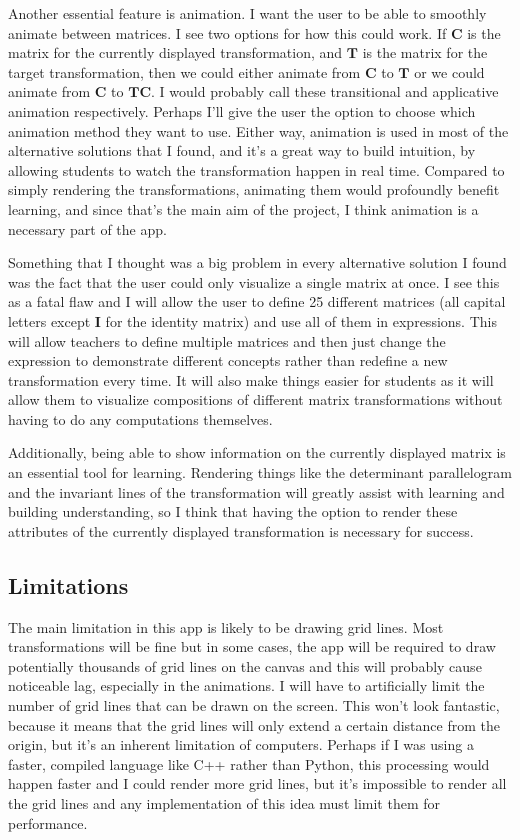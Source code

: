 \documentclass[../main.tex]{subfiles}
\begin{document}
Another essential feature is animation. I want the user to be able to smoothly animate between matrices. I see two options for how this could work. If $\mathbf{C}$ is the matrix for the currently displayed transformation, and $\mathbf{T}$ is the matrix for the target transformation, then we could either animate from $\mathbf{C}$ to $\mathbf{T}$ or we could animate from $\mathbf{C}$ to $\mathbf{TC}$. I would probably call these transitional and applicative animation respectively. Perhaps I'll give the user the option to choose which animation method they want to use. Either way, animation is used in most of the alternative solutions that I found, and it's a great way to build intuition, by allowing students to watch the transformation happen in real time. Compared to simply rendering the transformations, animating them would profoundly benefit learning, and since that's the main aim of the project, I think animation is a necessary part of the app.

Something that I thought was a big problem in every alternative solution I found was the fact that the user could only visualize a single matrix at once. I see this as a fatal flaw and I will allow the user to define 25 different matrices (all capital letters except $\mathbf{I}$ for the identity matrix) and use all of them in expressions. This will allow teachers to define multiple matrices and then just change the expression to demonstrate different concepts rather than redefine a new transformation every time. It will also make things easier for students as it will allow them to visualize compositions of different matrix transformations without having to do any computations themselves.

Additionally, being able to show information on the currently displayed matrix is an essential tool for learning. Rendering things like the determinant parallelogram and the invariant lines of the transformation will greatly assist with learning and building understanding, so I think that having the option to render these attributes of the currently displayed transformation is necessary for success.

\subsection{Limitations\label{subsection:limitations}}

The main limitation in this app is likely to be drawing grid lines. Most transformations will be fine but in some cases, the app will be required to draw potentially thousands of grid lines on the canvas and this will probably cause noticeable lag, especially in the animations. I will have to artificially limit the number of grid lines that can be drawn on the screen. This won't look fantastic, because it means that the grid lines will only extend a certain distance from the origin, but it's an inherent limitation of computers. Perhaps if I was using a faster, compiled language like C++ rather than Python, this processing would happen faster and I could render more grid lines, but it's impossible to render all the grid lines and any implementation of this idea must limit them for performance.
\end{document}
